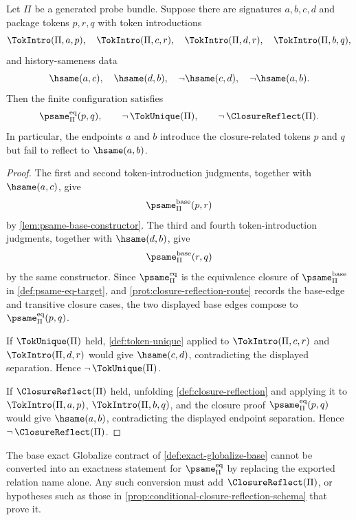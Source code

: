 \begin{theorem}
\label{thm:equivalence-closure-reflection-obstruction}
Let $\Pi$ be a generated probe bundle. Suppose there are signatures $a,b,c,d$ and package tokens $p,r,q$ with token introductions
$$
  \TokIntro(\Pi,a,p),\quad
  \TokIntro(\Pi,c,r),\quad
  \TokIntro(\Pi,d,r),\quad
  \TokIntro(\Pi,b,q),
$$
and history-sameness data
$$
  \hsame(a,c),\quad
  \hsame(d,b),\quad
  \neg\hsame(c,d),\quad
  \neg\hsame(a,b).
$$
Then the finite configuration satisfies
$$
  \psame_{\Pi}^{\mathrm{eq}}(p,q),
  \qquad
  \neg\,\TokUnique(\Pi),
  \qquad
  \neg\,\ClosureReflect(\Pi).
$$
In particular, the endpoints $a$ and $b$ introduce the closure-related tokens $p$ and $q$ but fail to reflect to $\hsame(a,b)$.
\end{theorem}

\begin{proof}
The first and second token-introduction judgments, together with $\hsame(a,c)$, give
$$
  \psame_{\Pi}^{\mathrm{base}}(p,r)
$$
by \autoref{lem:psame-base-constructor}. The third and fourth token-introduction judgments, together with $\hsame(d,b)$, give
$$
  \psame_{\Pi}^{\mathrm{base}}(r,q)
$$
by the same constructor. Since $\psame_{\Pi}^{\mathrm{eq}}$ is the equivalence closure of $\psame_{\Pi}^{\mathrm{base}}$ in \autoref{def:psame-eq-target}, and \autoref{prot:closure-reflection-route} records the base-edge and transitive closure cases, the two displayed base edges compose to $\psame_{\Pi}^{\mathrm{eq}}(p,q)$.

If $\TokUnique(\Pi)$ held, \autoref{def:token-unique} applied to $\TokIntro(\Pi,c,r)$ and $\TokIntro(\Pi,d,r)$ would give $\hsame(c,d)$, contradicting the displayed separation. Hence $\neg\,\TokUnique(\Pi)$.

If $\ClosureReflect(\Pi)$ held, unfolding \autoref{def:closure-reflection} and applying it to $\TokIntro(\Pi,a,p)$, $\TokIntro(\Pi,b,q)$, and the closure proof $\psame_{\Pi}^{\mathrm{eq}}(p,q)$ would give $\hsame(a,b)$, contradicting the displayed endpoint separation. Hence $\neg\,\ClosureReflect(\Pi)$.
\end{proof}

\begin{corollary}
\label{cor:eq-closure-exactness-needs-reflection}
The base exact Globalize contract of \autoref{def:exact-globalize-base} cannot be converted into an exactness statement for $\psame_{\Pi}^{\mathrm{eq}}$ by replacing the exported relation name alone. Any such conversion must add $\ClosureReflect(\Pi)$, or hypotheses such as those in \autoref{prop:conditional-closure-reflection-schema} that prove it.
\end{corollary}

